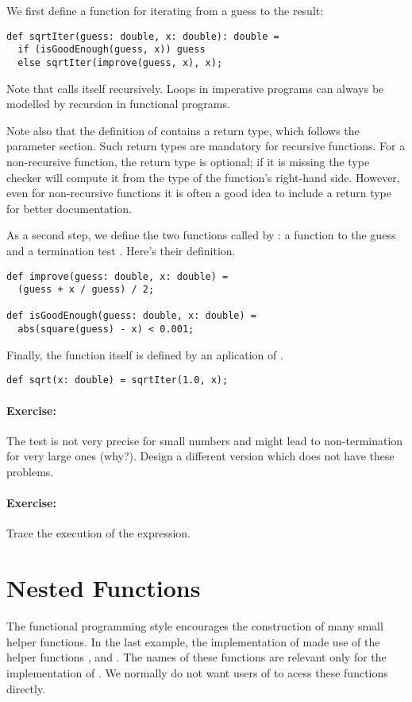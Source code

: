 \documentclass[a4paper,12pt,twoside,titlepage]{book}
\newcommand{\exercise}{\paragraph{Exercise:}}
\begin{document}
We first define a function for iterating from a guess to the result:
\begin{lstlisting}
def sqrtIter(guess: double, x: double): double = 
  if (isGoodEnough(guess, x)) guess
  else sqrtIter(improve(guess, x), x);
\end{lstlisting}
Note that  calls itself recursively.  Loops in
imperative programs can always be modelled by recursion in functional
programs. 

Note also that the definition of  contains a return
type, which follows the parameter section. Such return types are
mandatory for recursive functions. For a non-recursive function, the
return type is optional; if it is missing the type checker will
compute it from the type of the function's right-hand side. However,
even for non-recursive functions it is often a good idea to include a
return type for better documentation.

As a second step, we define the two functions called by
: a function to  the guess and a
termination test . Here's their definition.
\begin{lstlisting}
def improve(guess: double, x: double) = 
  (guess + x / guess) / 2;

def isGoodEnough(guess: double, x: double) = 
  abs(square(guess) - x) < 0.001;
\end{lstlisting}

Finally, the  function itself is defined by an aplication
of .
\begin{lstlisting}
def sqrt(x: double) = sqrtIter(1.0, x);
\end{lstlisting}

\exercise The  test is not very precise for small numbers
and might lead to non-termination for very large ones (why?).
Design a different version  which does not have these problems.

\exercise Trace the execution of the  expression.

\section{Nested Functions}

The functional programming style encourages the construction of many
small helper functions. In the last example, the implementation
of  made use of the helper functions
,  and
. The names of these functions 
are relevant only for the implementation of
. We normally do not want users of  to acess these functions
directly.
\end{document}
